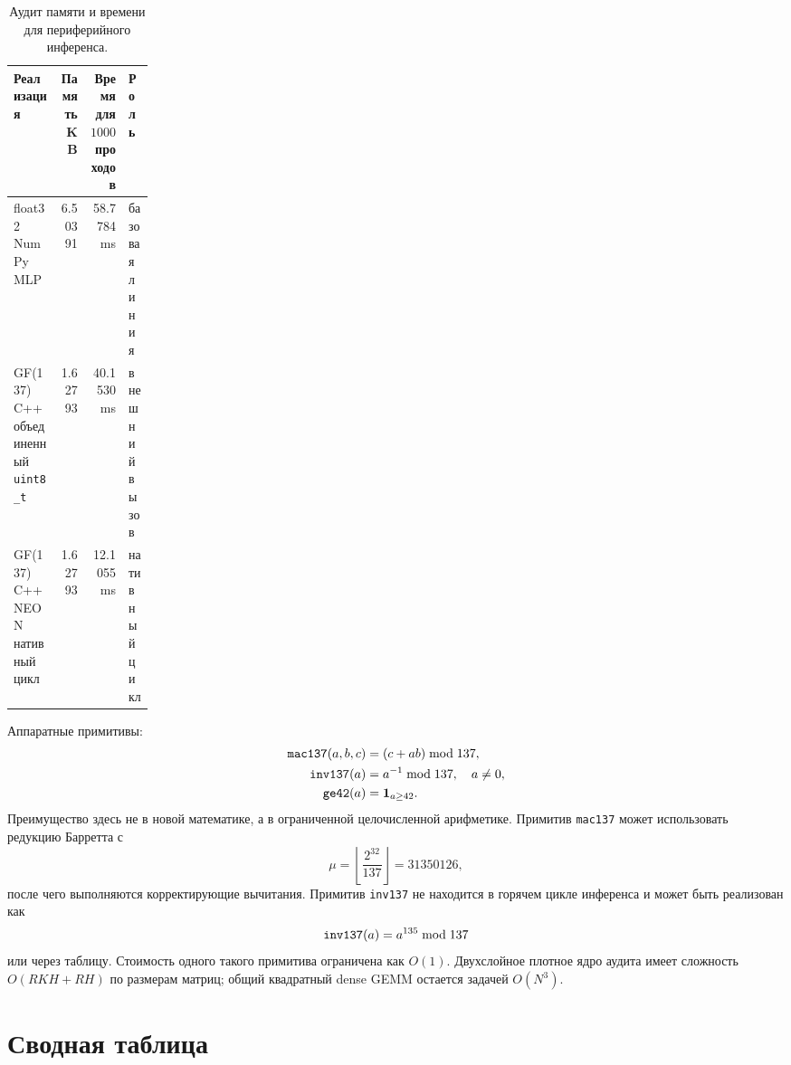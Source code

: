 \documentclass[11pt]{article}
\begin{document}
\begin{table}[h]
\centering
\caption{Аудит памяти и времени для периферийного инференса.}
\small
\setlength{\tabcolsep}{3pt}
\begin{tabularx}{\linewidth}{@{}YrrP{0.18\linewidth}@{}}
\toprule
Реализация & Память KB & Время для $1000$ проходов & Роль \\
\midrule
float32 NumPy MLP & 6.50391 & 58.7784 ms & базовая линия \\
GF(137) C++ объединенный \texttt{uint8\_t} & 1.62793 & 40.1530 ms & внешний вызов \\
GF(137) C++ NEON нативный цикл & 1.62793 & 12.1055 ms & нативный цикл \\
\bottomrule
\end{tabularx}
\end{table}

Аппаратные примитивы:
\begin{align}
    {\tt mac137}(a,b,c)&=(c+ab)\bmod137,\\
    {\tt inv137}(a)&=a^{-1}\bmod137,\quad a\ne0,\\
    {\tt ge42}(a)&=\mathbf{1}_{a\ge42}.
\end{align}
Преимущество здесь не в новой математике, а в ограниченной целочисленной
арифметике.  Примитив \texttt{mac137} может использовать редукцию Барретта с
\begin{equation}
    \mu=\left\lfloor\frac{2^{32}}{137}\right\rfloor=31350126,
\end{equation}
после чего выполняются корректирующие вычитания.  Примитив \texttt{inv137} не
находится в горячем цикле инференса и может быть реализован как
\begin{equation}
    {\tt inv137}(a)=a^{135}\bmod137
\end{equation}
или через таблицу.  Стоимость одного такого примитива ограничена как $O(1)$.
Двухслойное плотное ядро аудита имеет сложность $O(RKH+RH)$ по размерам
матриц; общий квадратный dense GEMM остается задачей $O(N^3)$.

\section{Сводная таблица}
\end{document}
